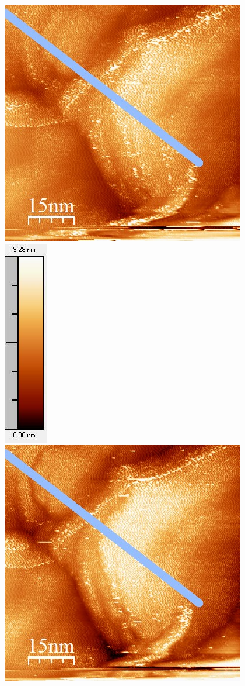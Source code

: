 \documentclass[12pt,a4paper]{article}
\begin{document}
\begin{figure}[H]
\centering
\includegraphics[scale=0.6]{Bilder/Anhang/IGain/8000_IGain_vor.jpg}
\includegraphics[scale=0.6]{Bilder/Anhang/IGain/8000_IGain_vor_Skala.jpg}
\includegraphics[scale=0.6]{Bilder/Anhang/IGain/8000_IGain_nach.jpg}

\end{figure}
\end{document}
